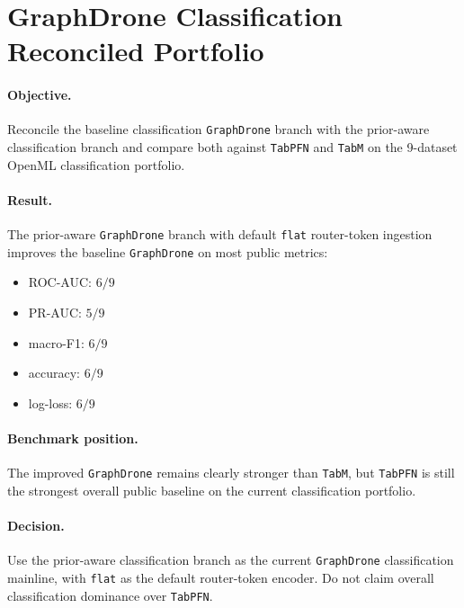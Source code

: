 \section{GraphDrone Classification Reconciled Portfolio}

\paragraph{Objective.}
Reconcile the baseline classification \texttt{GraphDrone} branch with the
prior-aware classification branch and compare both against \texttt{TabPFN} and
\texttt{TabM} on the 9-dataset OpenML classification portfolio.

\paragraph{Result.}
The prior-aware \texttt{GraphDrone} branch with default \texttt{flat}
router-token ingestion improves the baseline \texttt{GraphDrone} on most public
metrics:
\begin{itemize}
\item ROC-AUC: $6/9$
\item PR-AUC: $5/9$
\item macro-F1: $6/9$
\item accuracy: $6/9$
\item log-loss: $6/9$
\end{itemize}

\paragraph{Benchmark position.}
The improved \texttt{GraphDrone} remains clearly stronger than \texttt{TabM},
but \texttt{TabPFN} is still the strongest overall public baseline on the
current classification portfolio.

\paragraph{Decision.}
Use the prior-aware classification branch as the current \texttt{GraphDrone}
classification mainline, with \texttt{flat} as the default router-token
encoder. Do not claim overall classification dominance over \texttt{TabPFN}.
